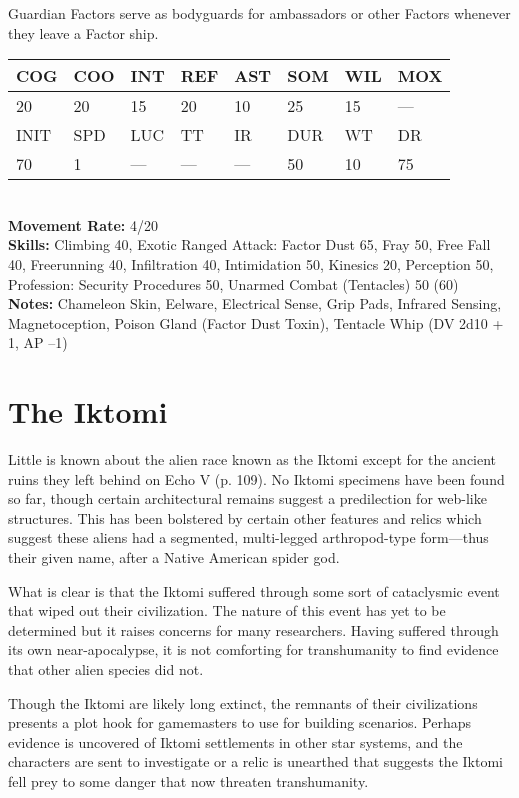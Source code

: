 Guardian Factors serve as bodyguards for ambassadors or other Factors whenever they leave a Factor ship. \\ \begin{tabular}{|l|l|l|l|l|l|l|l|} \hline

COG &COO &INT &REF &AST &SOM &WIL &MOX \\ \hline

20 &20 &15 &20 &10 &25 &15 &— \\ \hline

INIT &SPD &LUC &TT &IR &DUR &WT &DR \\ \hline

70 &1 &— &— &— &50 &10 &75 \\ \hline

\end{tabular} \\ \textbf{Movement Rate: }4/20 \\ \textbf{Skills:} Climbing 40, Exotic Ranged Attack: Factor Dust 65, Fray 50, Free Fall 40, Freerunning 40, Infiltration 40, Intimidation 50, Kinesics 20, Perception 50, Profession: Security Procedures 50, Unarmed Combat (Tentacles) 50 (60) \\ \textbf{Notes:} Chameleon Skin, Eelware, Electrical Sense, Grip Pads, Infrared Sensing, Magnetoception, Poison Gland (Factor Dust Toxin), Tentacle Whip (DV 2d10 + 1, AP –1) 



\section{The Iktomi} 

Little is known about the alien race known as the Iktomi except for the ancient ruins they left behind on Echo V (p. 109). No Iktomi specimens have been found so far, though certain architectural remains suggest a predilection for web-like structures. This has been bolstered by certain other features and relics which suggest these aliens had a segmented, multi-legged arthropod-type form—thus their given name, after a Native American spider god. 

What is clear is that the Iktomi suffered through some sort of cataclysmic event that wiped out their civilization. The nature of this event has yet to be determined but it raises concerns for many researchers. Having suffered through its own near-apocalypse, it is not comforting for transhumanity to find evidence that other alien species did not. 

Though the Iktomi are likely long extinct, the remnants of their civilizations presents a plot hook for gamemasters to use for building scenarios. Perhaps evidence is uncovered of Iktomi settlements in other star systems, and the characters are sent to investigate or a relic is unearthed that suggests the Iktomi fell prey to some danger that now threaten transhumanity. 

